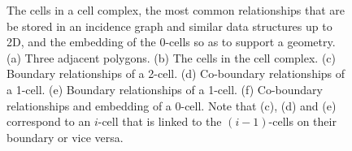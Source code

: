 \begin{figure}[tbp]
{\label{subfig:1-cell-boundary}}
\quad
{}
\quad
{}
\caption[Relationships in an incidence graph]{The cells in a cell complex, the most common relationships that are be stored in an incidence graph and similar data structures up to 2D, and the embedding of the 0-cells so as to support a geometry.
(a) Three adjacent polygons.
(b) The cells in the cell complex.
(c) Boundary relationships of a 2-cell.
(d) Co-boundary relationships of a 1-cell.
(e) Boundary relationships of a 1-cell.
(f) Co-boundary relationships and embedding of a 0-cell.
Note that (c), (d) and (e) correspond to an $i$-cell that is linked to the $(i-1)$-cells on their boundary or vice versa.}
\label{fig:ds_incidence_graph}
\end{figure}
